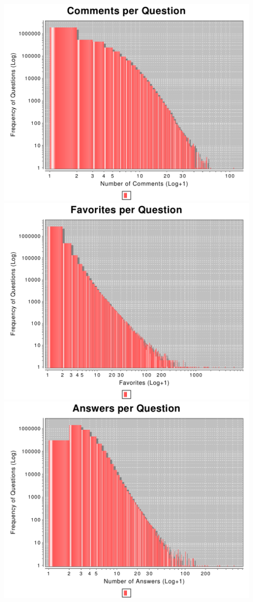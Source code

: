 \documentclass{article}
\begin{document}
\includegraphics[width=\linewidth]{parser/question-comments.pdf}
\includegraphics[width=\linewidth]{parser/question-favorites.pdf}
\includegraphics[width=\linewidth]{parser/question-answer.pdf}
\end{document}
